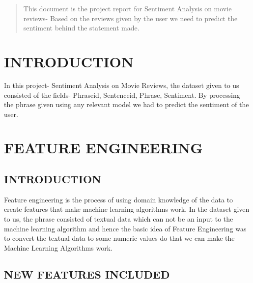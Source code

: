 \documentclass[12pt]{article}
\begin{document}





\maketitle
\thispagestyle{empty}
\pagestyle{empty}


\begin{abstract}

This document is the project report for Sentiment Analysis on movie reviews- Based on the reviews given by the user we need to predict the sentiment behind the statement made.

\end{abstract}


\section{INTRODUCTION}

In this project- Sentiment Analysis on Movie Reviews, the dataset given to us consisted of the fields- Phraseid, Sentenceid, Phrase, Sentiment. By processing the phrase given using any relevant model we had to predict the sentiment of the user.

\section{FEATURE ENGINEERING}

\subsection{INTRODUCTION}

Feature engineering is the process of using domain knowledge of the data to create features that make machine learning algorithms work. 
\newline
    In the dataset given to us, the phrase consisted of textual data which can
not be an input to the machine learning algorithm and hence the basic idea of Feature Engineering was to convert the textual data to some numeric values do that we can make the Machine Learning Algorithms work.    

\subsection{NEW FEATURES INCLUDED}
\end{document}
